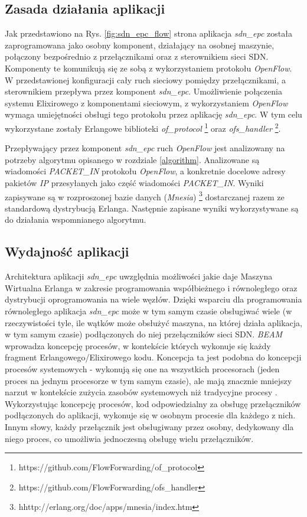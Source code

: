 \subsection{Zasada działania aplikacji}

Jak przedstawiono na Rys. \ref{fig:sdn_epc_flow} strona
\pageref{fig:sdn_epc_flow} aplikacja \textit{sdn\_epc} została zaprogramowana
jako osobny komponent, działający na osobnej maszynie, połączony bezpośrednio z
przełącznikami oraz z sterownikiem sieci SDN. Komponenty te komunikują się ze
sobą z wykorzystaniem protokołu \textit{OpenFlow}. W przedstawionej konfiguracji
cały ruch sieciowy pomiędzy przełącznikami, a sterownikiem przepływa przez
komponent \textit{sdn\_epc}. Umożliwienie połączenia systemu Elixirowego z
komponentami sieciowym, z wykorzystaniem \textit{OpenFlow} wymaga umiejętności
obsługi tego protokołu przez aplikację \textit{sdn\_epc}. W tym celu
wykorzystane zostały Erlangowe biblioteki \textit{of\_protocol}
\footnote{https://github.com/FlowForwarding/of\_protocol} oraz
\textit{ofs\_handler} \footnote{https://github.com/FlowForwarding/ofs\_handler}.

Przepływający przez komponent \textit{sdn\_epc} ruch \textit{OpenFlow} jest
analizowany na potrzeby algorytmu opisanego w rozdziale \ref{algorithm}.
Analizowane są wiadomości \textit{PACKET\_IN} protokołu \textit{OpenFlow}, a
konkretnie docelowe adresy pakietów \textit{IP} przesyłanych jako część
wiadomości \textit{PACKET\_IN}. Wyniki zapisywane są w rozproszonej bazie danych
(\textit{Mnesia}) \footnote{hhttp://erlang.org/doc/apps/mnesia/index.htm}
dostarczanej razem ze standardową dystrybucją Erlanga. Następnie zapisane
wyniki wykorzystywane są do działania wspomnianego algorytmu.

\subsection{Wydajność aplikacji}

Architektura aplikacji \textit{sdn\_epc} uwzględnia możliwości jakie daje
Maszyna Wirtualna Erlanga w zakresie programowania współbieżnego i równoległego
oraz dystrybucji oprogramowania na wiele węzłów. Dzięki wsparciu dla
programowania równoległego aplikacja \textit{sdn\_epc} może w tym samym czasie
obsługiwać wiele (w rzeczywistości tyle, ile wątków może obsłużyć maszyna, na
której działa aplikacja, w tym samym czasie) podłączonych do niej przełączników
sieci SDN. \textit{BEAM} wprowadza koncepcję procesów, w kontekście których
wykonuje się każdy fragment Erlangowego/Elixirowego kodu. Koncepcja ta jest
podobna do koncepcji procesów systemowych - wykonują się one na wszystkich
procesorach (jeden proces na jednym procesorze w tym samym czasie), ale mają
znacznie mniejszy narzut w kontekście zużycia zasobów systemowych niż tradycyjne
procesy \cite{progelixir}. Wykorzystując koncepcję procesów, kod odpowiedzialny
za obsługę przełączników podłączonych do aplikacji, wykonuje się w osobnym
procesie dla każdego z nich. Innym słowy, każdy przełącznik jest obsługiwany
przez osobny, dedykowany dla niego proces, co umożliwia jednoczesną obsługę
wielu przełączników.

